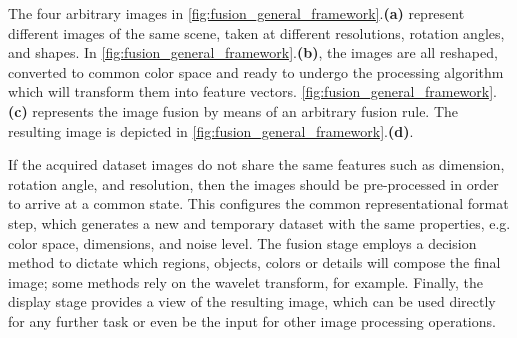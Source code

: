 The four arbitrary images in \autoref{fig:fusion_general_framework}.\textbf{(a)} represent different images of the same scene, taken at different resolutions, rotation angles, and shapes. In \autoref{fig:fusion_general_framework}.\textbf{(b)}, the images are all reshaped, converted to common color space and ready to undergo the processing algorithm which will transform them into feature vectors. \autoref{fig:fusion_general_framework}.\textbf{(c)} represents the image fusion by means of an arbitrary fusion rule. The resulting image is depicted in \autoref{fig:fusion_general_framework}.\textbf{(d)}.

If the acquired dataset images do not share the same features such as dimension, rotation angle, and resolution, then the images should be pre-processed in order to arrive at a common state. This configures the common representational format step, which generates a new and temporary dataset with the same properties, e.g. color space, dimensions, and noise level. The fusion stage employs a decision method to dictate which regions, objects, colors or details will compose the final image; some methods rely on the wavelet transform, for example. Finally, the display stage provides a view of the resulting image, which can be used directly for any further task or even be the input for other image processing operations. 

